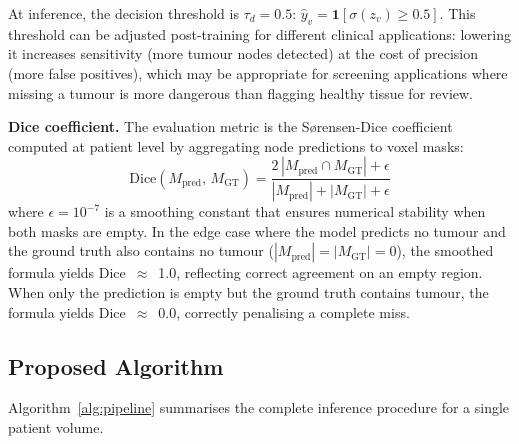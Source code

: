 \documentclass{article}
\begin{document}
At inference, the decision threshold is $\tau_d = 0.5$:
$\hat{y}_v = \mathbf{1}[\sigma(z_v) \geq 0.5]$. This threshold can be adjusted
post-training for different clinical applications: lowering it increases sensitivity
(more tumour nodes detected) at the cost of precision (more false positives), which
may be appropriate for screening applications where missing a tumour is more
dangerous than flagging healthy tissue for review.

\textbf{Dice coefficient.}
The evaluation metric is the Sørensen-Dice coefficient computed at patient level
by aggregating node predictions to voxel masks:
\[
    \mathrm{Dice}(M_{\text{pred}},\, M_{\text{GT}}) =
    \frac{2\,|M_{\text{pred}} \cap M_{\text{GT}}| + \epsilon}
         {|M_{\text{pred}}| + |M_{\text{GT}}| + \epsilon}
\]
where $\epsilon = 10^{-7}$ is a smoothing constant that ensures numerical stability
when both masks are empty. In the edge case where the model predicts no tumour and
the ground truth also contains no tumour ($|M_{\text{pred}}| = |M_{\text{GT}}| = 0$),
the smoothed formula yields Dice~$\approx$~1.0, reflecting correct agreement on an
empty region. When only the prediction is empty but the ground truth contains tumour,
the formula yields Dice~$\approx$~0.0, correctly penalising a complete miss.

\subsection{Proposed Algorithm}
\label{sec:algorithm}

Algorithm~\ref{alg:pipeline} summarises the complete inference procedure for a
single patient volume.
\end{document}

